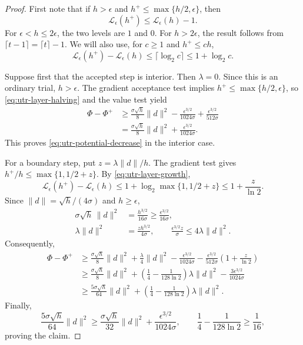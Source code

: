 \documentclass{article}
\begin{document}
\begin{proof}
First note that if $h>\epsilon$ and
$h^+\le\max\{h/2,\epsilon\}$, then
\begin{equation}\label{eq:utr-layer-halving}
 \mathcal L_\epsilon(h^+)\le\mathcal L_\epsilon(h)-1.
\end{equation}
For $\epsilon<h\le2\epsilon$, the two levels are $1$ and $0$.
For $h>2\epsilon$, the result follows from
$\lceil t-1\rceil=\lceil t\rceil-1$.
We will also use, for $c\ge1$ and $h^+\le ch$,
\begin{equation}\label{eq:utr-layer-growth}
 \mathcal L_\epsilon(h^+)-\mathcal L_\epsilon(h)
 \le\lceil\log_2c\rceil\le1+\log_2c.
\end{equation}

Suppose first that the accepted step is interior.  Then $\lambda=0$.
Since this is an ordinary trial, $h>\epsilon$.
The gradient acceptance test implies
$h^+\le\max\{h/2,\epsilon\}$, so \eqref{eq:utr-layer-halving} and
the value test yield
\begin{align*}
 \Phi-\Phi^+
 &\ge\frac{\sigma\sqrt h}{8}\|d\|^2
       -\frac{\epsilon^{3/2}}{1024\sigma}
       +\frac{\epsilon^{3/2}}{512\sigma}\\
 &=\frac{\sigma\sqrt h}{8}\|d\|^2
       +\frac{\epsilon^{3/2}}{1024\sigma}.
\end{align*}
This proves \eqref{eq:utr-potential-decrease} in the interior case.

For a boundary step, put $z=\lambda\|d\|/h$.  The gradient test gives
$h^+/h\le\max\{1,1/2+z\}$.  By \eqref{eq:utr-layer-growth},
\[
 \mathcal L_\epsilon(h^+)-\mathcal L_\epsilon(h)
 \le1+\log_2\max\{1,1/2+z\}
 \le1+\frac z{\ln2}.
\]
Since $\|d\|=\sqrt h/(4\sigma)$ and $h\ge\epsilon$,
\begin{align*}
 \sigma\sqrt h\,\|d\|^2
 &=\frac{h^{3/2}}{16\sigma}
   \ge\frac{\epsilon^{3/2}}{16\sigma},\\
 \lambda\|d\|^2&=\frac{zh^{3/2}}{4\sigma},
 \qquad
 \frac{\epsilon^{3/2}z}{\sigma}\le4\lambda\|d\|^2.
\end{align*}
Consequently,
\begin{align*}
 \Phi-\Phi^+
 &\ge\frac{\sigma\sqrt h}{8}\|d\|^2+\frac{\lambda}{4}\|d\|^2
       -\frac{\epsilon^{3/2}}{1024\sigma}
       -\frac{\epsilon^{3/2}}{512\sigma}
           \left(1+\frac z{\ln2}\right)\\
 &\ge\frac{\sigma\sqrt h}{8}\|d\|^2+
       \left(\frac14-\frac1{128\ln2}\right)\lambda\|d\|^2
       -\frac{3\epsilon^{3/2}}{1024\sigma}\\
 &\ge\frac{5\sigma\sqrt h}{64}\|d\|^2
       +\left(\frac14-\frac1{128\ln2}\right)\lambda\|d\|^2.
\end{align*}
Finally,
\[
 \frac{5\sigma\sqrt h}{64}\|d\|^2
 \ge\frac{\sigma\sqrt h}{32}\|d\|^2
       +\frac{\epsilon^{3/2}}{1024\sigma},
 \qquad
 \frac14-\frac1{128\ln2}\ge\frac1{16},
\]
proving the claim.
\end{proof}
\end{document}
